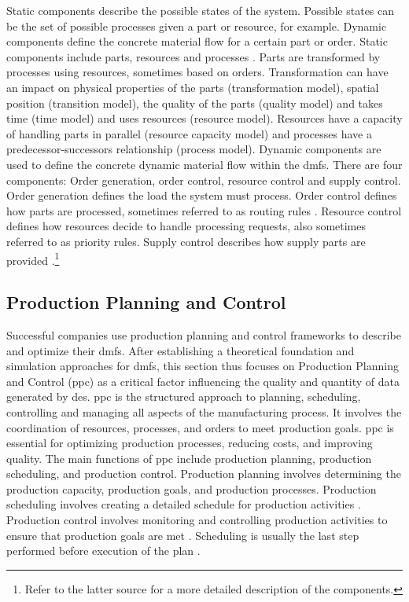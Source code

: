 Static components describe the possible states of the system. Possible states can be the set of possible processes given a part or resource, for example. Dynamic components define the concrete material flow for a certain part or order.
Static components include parts, resources and processes \autocite{schwede2024learning}. Parts are transformed by processes using resources, sometimes based on orders. Transformation can have an impact on physical properties of the parts (transformation model), spatial position (transition model), the quality of the parts (quality model) and takes time (time model) and uses resources (resource model). Resources have a capacity of handling parts in parallel (resource capacity model) and processes have a predecessor-successors relationship (process model).
Dynamic components are used to define the concrete dynamic material flow within the \gls{dmfs}. There are four components: Order generation, order control, resource control and supply control. Order generation defines the load the system must process. Order control defines how parts are processed, sometimes referred to as routing rules \autocite{mildeautomated}. Resource control defines how resources decide to handle processing requests, also sometimes referred to as priority rules. Supply control describes how supply parts are provided \autocite{mildeautomated,schwede2024learning}.\footnote{Refer to the latter source for a more detailed description of the components.}


\subsection{Production Planning and Control}
\label{sec:ppc}
Successful companies use production planning and control frameworks to describe and optimize their \gls{dmfs}. After establishing a theoretical foundation and simulation approaches for \gls{dmfs}, this section thus focuses on Production Planning and Control (\gls{ppc}) as a critical factor influencing the quality and quantity of data generated by \gls{des}.
\gls{ppc} is the structured approach to planning, scheduling, controlling and managing all aspects of the manufacturing process. It involves the coordination of resources, processes, and orders to meet production goals. \gls{ppc} is essential for optimizing production processes, reducing costs, and improving quality. The main functions of \gls{ppc} include production planning, production scheduling, and production control. Production planning involves determining the production capacity, production goals, and production processes. Production scheduling involves creating a detailed schedule for production activities \autocite{kasper2024designing}. Production control involves monitoring and controlling production activities to ensure that production goals are met \autocite{kiran2019production}. Scheduling is usually the last step performed before execution of the plan \autocite{pinedo2012design}.

